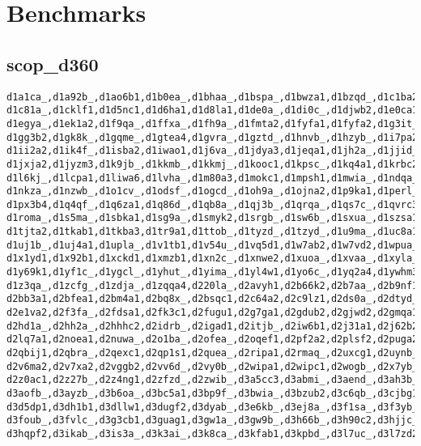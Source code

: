 \documentclass[letter]{article}
\begin{document}
\section{Benchmarks}

\subsection{scop\_d360}

\begin{verbatim}
d1a1ca_,d1a92b_,d1ao6b1,d1b0ea_,d1bhaa_,d1bspa_,d1bwza1,d1bzqd_,d1c1ba2,d1c3pa_,
d1c81a_,d1cklf1,d1d5nc1,d1d6ha1,d1d8la1,d1de0a_,d1di0c_,d1djwb2,d1e0ca1,d1e9ha_,
d1egya_,d1ek1a2,d1f9qa_,d1ffxa_,d1fh9a_,d1fmta2,d1fyfa1,d1fyfa2,d1g3it_,d1g63i_,
d1gg3b2,d1gk8k_,d1gqme_,d1gtea4,d1gvra_,d1gztd_,d1hnvb_,d1hzyb_,d1i7pa2,d1ia2a_,
d1ii2a2,d1ik4f_,d1isba2,d1iwao1,d1j6va_,d1jdya3,d1jeqa1,d1jh2a_,d1jjid_,d1jrqb2,
d1jxja2,d1jyzm3,d1k9jb_,d1kkmb_,d1kkmj_,d1kooc1,d1kpsc_,d1kq4a1,d1krbc2,d1ksda1,
d1l6kj_,d1lcpa1,d1liwa6,d1lvha_,d1m80a3,d1mokc1,d1mpsh1,d1mwia_,d1ndqa_,d1ni6c_,
d1nkza_,d1nzwb_,d1o1cv_,d1odsf_,d1ogcd_,d1oh9a_,d1ojna2,d1p9ka1,d1perl_,d1pf9i3,
d1px3b4,d1q4qf_,d1q6za1,d1q86d_,d1qb8a_,d1qj3b_,d1qrqa_,d1qs7c_,d1qvrc3,d1r67a1,
d1roma_,d1s5ma_,d1sbka1,d1sg9a_,d1smyk2,d1srgb_,d1sw6b_,d1sxua_,d1szsa1,d1th8a1,
d1tjta2,d1tkab1,d1tkba3,d1tr9a1,d1ttob_,d1tyzd_,d1tzyd_,d1u9ma_,d1uc8a1,d1uf5a_,
d1uj1b_,d1uj4a1,d1upla_,d1v1tb1,d1v54u_,d1vq5d1,d1w7ab2,d1w7vd2,d1wpua_,d1x0sa_,
d1x1yd1,d1x92b1,d1xckd1,d1xmzb1,d1xn2c_,d1xnwe2,d1xuoa_,d1xvaa_,d1xyla_,d1y3be2,
d1y69k1,d1yf1c_,d1ygcl_,d1yhut_,d1yima_,d1yl4w1,d1yo6c_,d1yq2a4,d1ywhm3,d1z25a3,
d1z3qa_,d1zcfg_,d1zdja_,d1zqqa4,d220la_,d2avyh1,d2b66k2,d2b7aa_,d2b9nf1,d2b9no1,
d2bb3a1,d2bfea1,d2bm4a1,d2bq8x_,d2bsqc1,d2c64a2,d2c9lz1,d2ds0a_,d2dtyd_,d2dxia2,
d2e1va2,d2f3fa_,d2fdsa1,d2fk3c1,d2fugu1,d2g7ga1,d2gdub2,d2gjwd2,d2gmqa1,d2hbxb_,
d2hd1a_,d2hh2a_,d2hhhc2,d2idrb_,d2igad1,d2itjb_,d2iw6b1,d2j31a1,d2j62b2,d2juaa1,
d2lq7a1,d2noea1,d2nuwa_,d2o1ba_,d2ofea_,d2oqef1,d2pf2a2,d2plsf2,d2puga2,d2q7qh_,
d2qbij1,d2qbra_,d2qexc1,d2qp1s1,d2quea_,d2ripa1,d2rmaq_,d2uxcg1,d2uynb_,d2v4eg_,
d2v6ma2,d2v7xa2,d2vggb2,d2vv6d_,d2vy0b_,d2wipa1,d2wipc1,d2wogb_,d2x7yb_,d2yzdg1,
d2z0ac1,d2z27b_,d2z4ng1,d2zfzd_,d2zwib_,d3a5cc3,d3abmi_,d3aend_,d3ah3b_,d3anzi1,
d3aofb_,d3ayzb_,d3b6oa_,d3bc5a1,d3bp9f_,d3bwia_,d3bzub2,d3c6qb_,d3cjbg1,d3cojc2,
d3d5dp1,d3dh1b1,d3dllw1,d3dugf2,d3dyab_,d3e6kb_,d3ej8a_,d3f1sa_,d3f3yb_,d3flqa_,
d3foub_,d3fvlc_,d3g3cb1,d3guag1,d3gw1a_,d3gw9b_,d3h66b_,d3h90c2,d3hjjc_,d3hlib_,
d3hqpf2,d3ikab_,d3is3a_,d3k3ai_,d3k8ca_,d3kfab1,d3kpbd_,d3l7uc_,d3l7zd2,d3m5ka_,

\end{verbatim}
\end{document}
